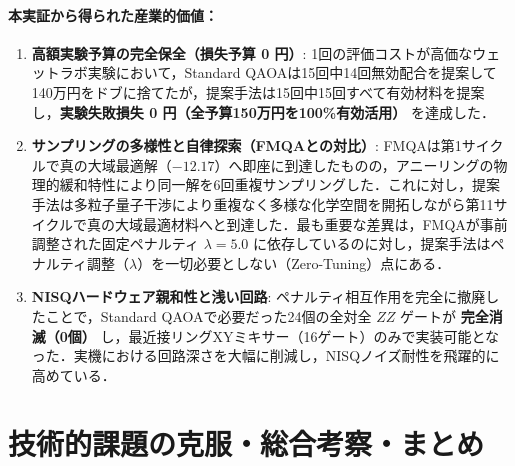 \documentclass[11pt,a4paper]{ltjsarticle}
\begin{document}
\vspace{-2mm}
\paragraph{本実証から得られた産業的価値：}
\begin{enumerate}\setlength{\itemsep}{1pt}
    \item \textbf{高額実験予算の完全保全（損失予算 0 円）}:
    1回の評価コストが高価なウェットラボ実験において，Standard QAOAは15回中14回無効配合を提案して140万円をドブに捨てたが，提案手法は15回中15回すべて有効材料を提案し，\textbf{実験失敗損失 0 円（全予算150万円を100\%有効活用）} を達成した．

    \item \textbf{サンプリングの多様性と自律探索（FMQAとの対比）}:
    FMQAは第1サイクルで真の大域最適解（$-12.17$）へ即座に到達したものの，アニーリングの物理的緩和特性により同一解を6回重複サンプリングした．これに対し，提案手法は多粒子量子干渉により重複なく多様な化学空間を開拓しながら第11サイクルで真の大域最適材料へと到達した．最も重要な差異は，FMQAが事前調整された固定ペナルティ $\lambda=5.0$ に依存しているのに対し，提案手法はペナルティ調整（$\lambda$）を一切必要としない（Zero-Tuning）点にある．

    \item \textbf{NISQハードウェア親和性と浅い回路}:
    ペナルティ相互作用を完全に撤廃したことで，Standard QAOAで必要だった24個の全対全 $ZZ$ ゲートが \textbf{完全消滅（0個）} し，最近接リングXYミキサー（16ゲート）のみで実装可能となった．実機における回路深さを大幅に削減し，NISQノイズ耐性を飛躍的に高めている．
\end{enumerate}

\clearpage

\section{技術的課題の克服・総合考察・まとめ}
\label{sec:summary}

\vspace{-1mm}
\end{document}
